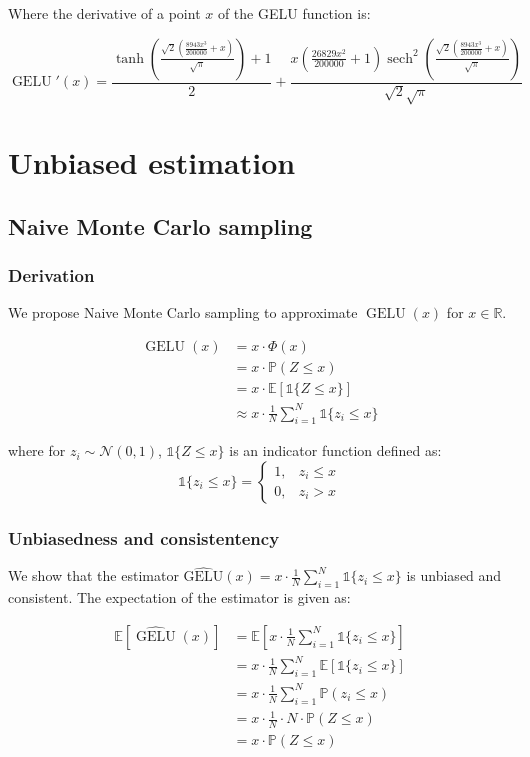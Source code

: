 \documentclass{article}
\begin{document}
Where the derivative of a point $x$ of the GELU function is:

$$\operatorname{GELU}'(x) = 
\frac{\tanh\left(\frac{\sqrt{2} \left(\frac{8943x^{3}}{200000} + x\right)}{\sqrt{\pi}}\right) + 1}{2} + \frac{x \left(\frac{26829x^{2}}{200000} + 1\right) \operatorname{sech}^{2}\left(\frac{\sqrt{2} \left(\frac{8943x^{3}}{200000} + x\right)}{\sqrt{\pi}}\right)}{\sqrt{2} \sqrt{\pi}}
$$

\section{Unbiased estimation}
\subsection{Naive Monte Carlo sampling}
\subsubsection{Derivation}
We propose Naive Monte Carlo sampling to approximate $\operatorname{GELU}(x)$ for $x\in \mathbb{R}$.

\begin{align*}
    \operatorname{GELU}(x) &= x\cdot \Phi(x)\\
    &= x \cdot \mathbb{P}(Z \leq x)\\
    &= x \cdot \mathbb{E}\left[ \mathds{1}\{Z \leq x\} \right]\\
    &\approx x \cdot  \frac{1}{N} \sum_{i=1}^{N} \mathds{1}\{z_i \leq x\} 
\end{align*}

where for $z_i \sim\mathcal{N}(0, 1)$, $\mathds{1}\{Z \leq x\}$ is an indicator function defined as:
$$
\mathds{1}\{z_i \leq x\} = 
\begin{cases} 
1, & z_i \leq x \\
0, & z_i > x 
\end{cases}
$$
\subsubsection{Unbiasedness and consistentency}
We show that the estimator $\hat{\text{GELU}}(x) = x \cdot \frac{1}{N} \sum_{i=1}^{N} \mathds{1}\{z_i \leq x\}$ is unbiased and consistent. The expectation of the estimator is given as:

\begin{align*}
\mathbb{E}\left[\hat{\operatorname{GELU}}(x)\right] &= \mathbb{E}\left[ x \cdot \frac{1}{N} \sum_{i=1}^{N} \mathds{1}\{z_i \leq x\} \right] \\
&= x \cdot \frac{1}{N} \sum_{i=1}^{N} \mathbb{E}[\mathds{1}\{z_i \leq x\}]\\
&= x \cdot \frac{1}{N} \sum_{i=1}^{N} \mathbb{P}(z_i \leq x)\\
&= x \cdot \frac{1}{N} \cdot N \cdot \mathbb{P}(Z \leq x)\\
&= x \cdot \mathbb{P}(Z \leq x)
\end{align*}
\end{document}
